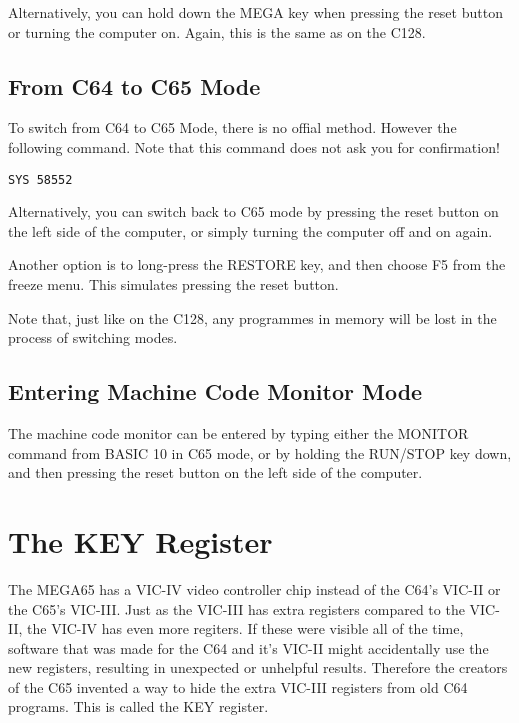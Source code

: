 Alternatively, you can hold down the MEGA key when pressing the reset button or turning the computer on. Again,
this is the same as on the C128.

\subsection{From C64 to C65 Mode}

To switch from C64 to C65 Mode, there is no offial method.  However the following command.  Note that this command
does not ask you for confirmation!

\begin{tcolorbox}[colback=black,coltext=white]
\verbatimfont{\codefont}
\begin{verbatim}
SYS 58552
\end{verbatim}
\end{tcolorbox}

Alternatively, you can switch back to C65 mode by pressing the reset button on the left side of the computer, or simply turning the computer off and on again.

Another option is to long-press the RESTORE key, and then choose F5 from the freeze menu.  This simulates pressing the reset button.

Note that, just like on the C128, any programmes in memory will be lost in the process of switching modes.

\subsection{Entering Machine Code Monitor Mode}

The machine code monitor can be entered by typing either the MONITOR command from BASIC 10 in C65 mode,
or by holding the RUN/STOP key down, and then pressing the reset button on the left side of the computer.

\section{The KEY Register}

The MEGA65 has a VIC-IV video controller chip instead of the C64's VIC-II or
the C65's VIC-III.  Just as the VIC-III has extra registers compared to the
VIC-II, the VIC-IV has even more regiters.  If these were visible all of the time,
software that was made for the C64 and it's VIC-II might accidentally use the
new registers, resulting in unexpected or unhelpful results.  Therefore the
creators of the C65 invented a way to hide the extra VIC-III registers from old
C64 programs. This is called the KEY register.

